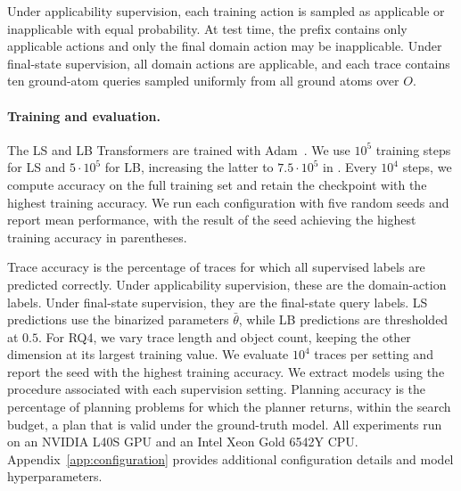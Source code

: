 Under applicability supervision, each training action is sampled as applicable or inapplicable with equal probability. At test time, the prefix contains only applicable actions and only the final domain action may be inapplicable. Under final-state supervision, all domain actions are applicable, and each trace contains ten ground-atom queries sampled uniformly from all ground atoms over $O$.

\paragraph{Training and evaluation.}
The LS and LB Transformers are trained with Adam~\citep{liu2019variance}. We use $10^5$ training steps for LS and $5\cdot10^5$ for LB, increasing the latter to $7.5\cdot10^5$ in \lgt. Every $10^4$ steps, we compute accuracy on the full training set and retain the checkpoint with the highest training accuracy. We run each configuration with five random seeds and report mean performance, with the result of the seed achieving the highest training accuracy in parentheses.

Trace accuracy is the percentage of traces for which all supervised labels are predicted correctly. Under applicability supervision, these are the domain-action labels. Under final-state supervision, they are the final-state query labels. LS predictions use the binarized parameters $\bar{\theta}$, while LB
predictions are thresholded at $0.5$.
For RQ4, we vary trace length and object count, keeping the other dimension at its largest training value. We evaluate $10^4$ traces per setting and report the seed with the highest training accuracy.
We extract \strips models using the procedure associated with each supervision setting.
Planning accuracy is the percentage of planning problems for which the planner returns, within the search budget, a plan that is valid under the ground-truth model. All experiments run on an NVIDIA L40S GPU and an Intel Xeon Gold 6542Y CPU. Appendix~\ref{app:configuration} provides additional configuration details and model hyperparameters.

